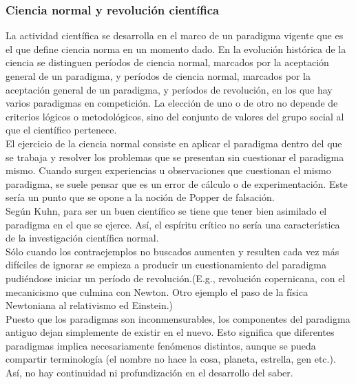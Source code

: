 \documentclass[a4paper, 11pt, twocolumn, spanish]{article}
\begin{document}
\subsubsection{Ciencia normal y revolución científica}
\label{sec:org7709a3c}
La actividad científica se desarrolla en el marco de un paradigma
vigente que es el que define ciencia norma en un momento dado. En la
evolución histórica de la ciencia se distinguen períodos de ciencia
normal, marcados por la aceptación general de un paradigma, y
períodos de ciencia normal, marcados por la aceptación general de un
paradigma, y períodos de revolución, en los que hay varios paradigmas
en competición. La elección de uno o de otro no depende de criterios
lógicos o metodológicos, sino del conjunto de valores del grupo social
al que el científico pertenece.\\[0pt]

El ejercicio de la ciencia normal consiste en aplicar el paradigma
dentro del que se trabaja y resolver los problemas que se presentan
sin cuestionar el paradigma mismo. Cuando surgen experiencias u
observaciones que cuestionan el mismo paradigma, se suele pensar que
es un error de cálculo o de experimentación. Este sería un punto que
se opone a la noción de Popper de falsación.\\[0pt]
Según Kuhn, para ser un buen científico se tiene que tener bien
asimilado el paradigma en el que se ejerce. Así, el espíritu crítico
no sería una característica de la investigación científica normal.\\[0pt]
Sólo cuando los contraejemplos no buscados aumenten y resulten cada
vez más difíciles de ignorar se empieza a producir un cuestionamiento
del paradigma pudiéndose iniciar un período de revolución.(E.g.,
revolución copernicana, con el mecanicismo que culmina con
Newton. Otro ejemplo el paso de la física Newtoniana al relativismo ed
Einstein.)\\[0pt]

Puesto que los paradigmas son inconmensurables, los componentes del
paradigma antiguo dejan simplemente de existir en el nuevo. Esto
significa que diferentes paradigmas implica necesariamente fenómenos
distintos, aunque se pueda compartir terminología (el nombre no hace
la cosa, planeta, estrella, gen etc.). Así, no hay continuidad ni
profundización en el desarrollo del saber.
\end{document}
